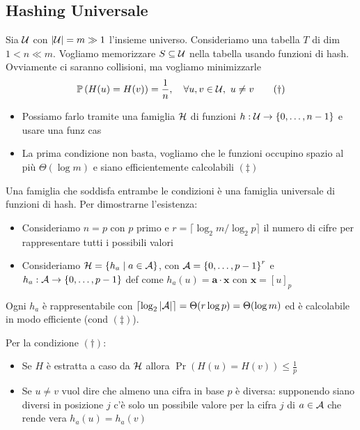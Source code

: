 
\subsection{Hashing Universale}

Sia $\mathcal{U}$ con $|\mathcal{U}| = m \gg 1$ l'insieme universo. Consideriamo una tabella $T$ di dim $1 < n \ll m$. Vogliamo memorizzare $S \subseteq \mathcal{U}$ nella tabella usando funzioni di hash. Ovviamente ci saranno collisioni, ma vogliamo minimizzarle
\[ \mathbb{P} \left(H(u) = H(v)\right) = \frac{1}{n}, \quad \forall u,v \in \mathcal{U}, \ u \neq v \tag{\dag} \]
\begin{itemize}
	\item Possiamo farlo tramite una famiglia $\mathcal{H}$ di funzioni $h : \mathcal{U} \rightarrow \left\{0, \dots, n-1 \right\}$ e usare una funz cas
	
	\item La prima condizione non basta, vogliamo che le funzioni occupino spazio al più $\Theta (\log m)$ e siano efficientemente calcolabili $(\ddag)$
\end{itemize}

Una famiglia che soddisfa entrambe le condizioni è una famiglia universale di funzioni di hash. Per dimostrarne l'esistenza:
\begin{itemize}
	\item Consideriamo $n = p$ con $p$ primo e $r = \lceil \log_2 m / \log_2 p \rceil$ il numero di cifre per rappresentare tutti i possibili valori
	
	\item Consideriamo $\mathcal{H} = \left\{h_a \mid a \in \mathcal{A} \right\}$, con $\mathcal{A} = \left\{0, \dots, p-1\right\}^r$ e $h_a : \mathcal{A} \rightarrow \left\{0, \dots, p-1\right\}$ def come $h_a (u) = \bm a \cdot \bm x$ con $\bm x = [u]_p$
\end{itemize}

Ogni $h_a$ è rappresentabile con $\lceil \log_2 |\mathcal{A}|\rceil = \Theta (r \log p) = \Theta (\log m)$ ed è calcolabile in modo efficiente (cond $(\ddag)$).

Per la condizione $(\dag)$:
\begin{itemize}
	\item Se $H$ è estratta a caso da $\mathcal{H}$ allora $\Pr \left(H(u) = H(v)\right) \leq \frac{1}{p}$
	
	\item Se $u \neq v$ vuol dire che almeno una cifra in base $p$ è diversa: supponendo siano diversi in posizione $j$ c'è solo un possibile valore per la cifra $j$ di $a \in \mathcal{A}$ che rende vera $h_a (u) = h_a (v)$
\end{itemize}

